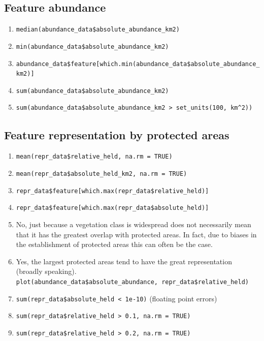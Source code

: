 \documentclass[
  12pt,
]{book}
\makeatletter
\providecommand{\tightlist}{%
  \setlength{\itemsep}{0pt}\setlength{\parskip}{0pt}}
\newenvironment{kframe}{%
\medskip{}
\setlength{\fboxsep}{.8em}
 \def\at@end@of@kframe{}%
 \ifinner\ifhmode%
  \def\at@end@of@kframe{\end{minipage}}%
  \begin{minipage}{\columnwidth}%
 \fi\fi%
 \def\FrameCommand##1{\hskip\@totalleftmargin \hskip-\fboxsep
 \colorbox{shadecolor}{##1}\hskip-\fboxsep
     \hskip-\linewidth \hskip-\@totalleftmargin \hskip\columnwidth}%
 \MakeFramed {\advance\hsize-\width
   \@totalleftmargin\z@ \linewidth\hsize
   \@setminipage}}%
 {\par\unskip\endMakeFramed%
 \at@end@of@kframe}
\newenvironment{rmdblock}[1]
  {
  \begin{itemize}
  \renewcommand{\labelitemi}{
    \raisebox{-.7\height}[0pt][0pt]{
      {\setkeys{Gin}{width=3em,keepaspectratio}\texttt{[image: images/\#1]}}
    }
  }
  \setlength{\fboxsep}{1em}
  \begin{kframe}
  \item
  }
  {
  \end{kframe}
  \end{itemize}
  }
\newenvironment{rmdanswer}
  {\begin{rmdblock}{answer}}
  {\end{rmdblock}}
\makeatother
\begin{document}
\hypertarget{feature-abundance-1}{%
\subsection{Feature abundance}\label{feature-abundance-1}}

\begin{rmdanswer}
\begin{enumerate}
\def\labelenumi{\arabic{enumi}.}
\tightlist
\item
  \texttt{median(abundance\_data\$absolute\_abundance\_km2)}
\item
  \texttt{min(abundance\_data\$absolute\_abundance\_km2)}
\item
  \texttt{abundance\_data\$feature{[}which.min(abundance\_data\$absolute\_abundance\_km2){]}}
\item
  \texttt{sum(abundance\_data\$absolute\_abundance\_km2)}
\item
  \texttt{sum(abundance\_data\$absolute\_abundance\_km2\ \textgreater{}\ set\_units(100,\ km\^{}2))}
\end{enumerate}
\end{rmdanswer}

\hypertarget{feature-representation-by-protected-areas-1}{%
\subsection{Feature representation by protected areas}\label{feature-representation-by-protected-areas-1}}

\begin{rmdanswer}
\begin{enumerate}
\def\labelenumi{\arabic{enumi}.}
\tightlist
\item
  \texttt{mean(repr\_data\$relative\_held,\ na.rm\ =\ TRUE)}
\item
  \texttt{mean(repr\_data\$absolute\_held\_km2,\ na.rm\ =\ TRUE)}
\item
  \texttt{repr\_data\$feature{[}which.max(repr\_data\$relative\_held){]}}
\item
  \texttt{repr\_data\$feature{[}which.max(repr\_data\$absolute\_held){]}}
\item
  No, just because a vegetation class is widespread does not necessarily mean that it has the greatest overlap with protected areas. In fact, due to biases in the establishment of protected areas this can often be the case.
\item
  Yes, the largest protected areas tend to have the great representation (broadly speaking). \newline
  \texttt{plot(abundance\_data\$absolute\_abundance,\ repr\_data\$relative\_held)}
\item
  \texttt{sum(repr\_data\$absolute\_held\ \textless{}\ 1e-10)} (floating point errors)
\item
  \texttt{sum(repr\_data\$relative\_held\ \textgreater{}\ 0.1,\ na.rm\ =\ TRUE)}
\item
  \texttt{sum(repr\_data\$relative\_held\ \textgreater{}\ 0.2,\ na.rm\ =\ TRUE)}
\end{enumerate}
\end{rmdanswer}
\end{document}
